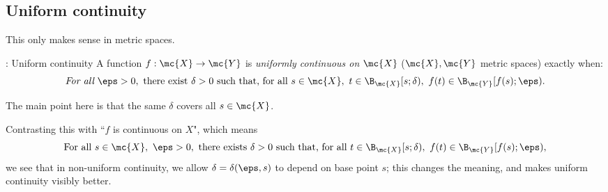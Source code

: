 \subsection{Uniform continuity}
This only makes sense in metric spaces.

\begin{ndef}{: Uniform continuity}
	A function \(f:\mc{X}\to\mc{Y}\) is \emph{uniformly continuous on \(\mc{X}\)} (\(\mc{X},\mc{Y}\) metric spaces) exactly when:
	\begin{equation*}
		\emph{For all}~\eps>0,~\text{there exist}~\delta>0~\text{such that, for all}~s\in\mc{X},~t\in\B_{\mc{X}}[s;\delta),~f(t)\in\B_{\mc{Y}}[f(s);\eps).
	\end{equation*}
\end{ndef}
\begin{note}
	The main point here is that the same \(\delta\) covers all \(s\in\mc{X}\).
\end{note}
Contrasting this with ``\(f\) is continuous on \(X\)", which means 
\begin{equation*}
	\text{For all}~s\in\mc{X},~\eps>0,~\text{there exists}~\delta>0~\text{such that, for all}~t\in\B_{\mc{X}}[s;\delta),~f(t)\in\B_{\mc{Y}}[f(s);\eps),
\end{equation*}
we see that in non-uniform continuity, we allow \(\delta=\delta(\eps,s)\) to depend on base point \(s\); this changes the meaning, and makes uniform continuity visibly better.
